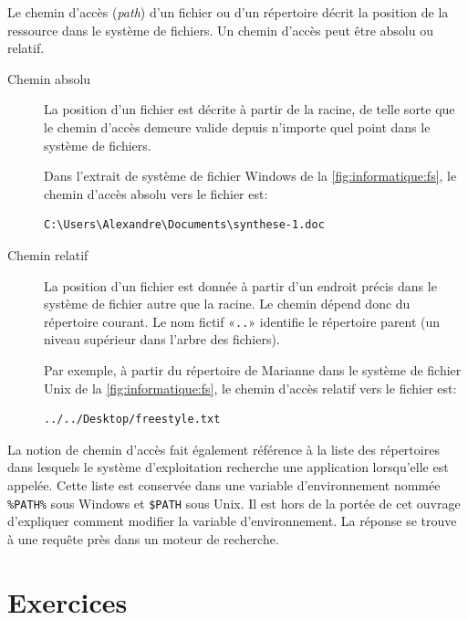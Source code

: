 Le chemin d'accès (\emph{path}) d'un fichier ou
d'un répertoire décrit la position de la ressource dans le système de
fichiers. Un chemin d'accès peut être absolu ou relatif.
\begin{description}
\item[Chemin absolu]  La position d'un
  fichier est décrite à partir de la racine, de telle sorte que le
  chemin d'accès demeure valide depuis n'importe quel point dans le
  système de fichiers.

  Dans l'extrait de système de fichier Windows de la
  \autoref{fig:informatique:fs}, le chemin d'accès absolu vers le
  fichier  est:
\begin{Schunk}
\begin{Verbatim}
C:\Users\Alexandre\Documents\synthese-1.doc
\end{Verbatim}
\end{Schunk}
\item[Chemin relatif]  La position d'un
  fichier est donnée à partir d'un endroit précis dans le système de
  fichier autre que la racine. Le chemin dépend donc du répertoire
  courant. Le nom fictif «\verb=..=» identifie le répertoire parent
  (un niveau supérieur dans l'arbre des fichiers).

  Par exemple, à partir du répertoire  de
  Marianne dans le système de fichier Unix de la
  \autoref{fig:informatique:fs}, le chemin d'accès relatif vers le
  fichier  est:
\begin{Schunk}
\begin{Verbatim}
../../Desktop/freestyle.txt
\end{Verbatim}
\end{Schunk}
\end{description}

La notion de chemin d'accès fait également référence à la liste des
répertoires dans lesquels le système d'exploitation recherche une
application lorsqu'elle est appelée. Cette liste est conservée dans
une variable d'environnement nommée \verb=%PATH%= sous
Windows
et
\verb=$PATH= sous Unix. Il est hors de la portée de cet
ouvrage d'expliquer comment modifier la variable d'environnement. La
réponse se trouve à une requête près dans un moteur de recherche.


\section{Exercices}
\label{operateurs:exercices}

